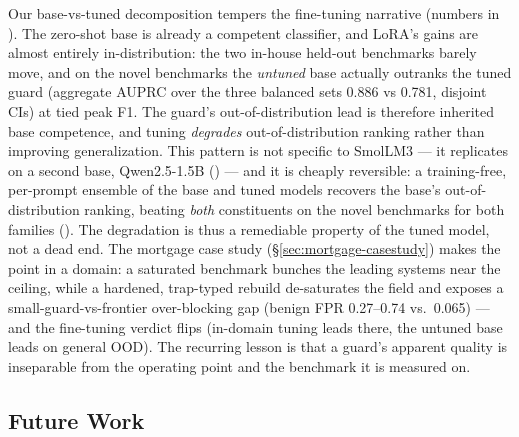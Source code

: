 \documentclass[sigconf,nonacm]{acmart}
\begin{document}
Our base-vs-tuned decomposition tempers the fine-tuning narrative (numbers in ). The zero-shot base is already a competent classifier, and LoRA's gains are almost entirely in-distribution: the two in-house held-out benchmarks barely move, and on the novel benchmarks the \emph{untuned} base actually outranks the tuned guard (aggregate AUPRC over the three balanced sets 0.886 vs 0.781, disjoint CIs) at tied peak F1. The guard's out-of-distribution lead is therefore inherited base competence, and tuning \emph{degrades} out-of-distribution ranking rather than improving generalization. This pattern is not specific to SmolLM3 --- it replicates on a second base, Qwen2.5-1.5B () --- and it is cheaply reversible: a training-free, per-prompt ensemble of the base and tuned models recovers the base's out-of-distribution ranking, beating \emph{both} constituents on the novel benchmarks for both families (). The degradation is thus a remediable property of the tuned model, not a dead end. The mortgage case study (\S\ref{sec:mortgage-casestudy}) makes the point in a domain: a saturated benchmark bunches the leading systems near the ceiling, while a hardened, trap-typed rebuild de-saturates the field and exposes a small-guard-vs-frontier over-blocking gap (benign FPR 0.27--0.74 vs.\ 0.065) --- and the fine-tuning verdict flips (in-domain tuning leads there, the untuned base leads on general OOD). The recurring lesson is that a guard's apparent quality is inseparable from the operating point and the benchmark it is measured on.

\subsection{Future Work}\label{sec:future}
\end{document}
